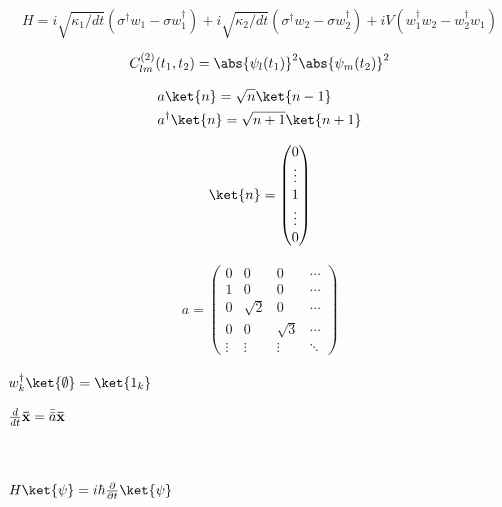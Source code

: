 \begin{equation}
    H = i \sqrt{\kappa_1/dt}(\sigma^\dagger w_1 - \sigma w_1^\dagger)+i \sqrt{\kappa_2/dt}(\sigma^\dagger w_2 - \sigma w_2^\dagger) + i V(w_1 ^\dagger w_2 - w_2^\dagger w_1) 
\end{equation}

\begin{equation}
    C_{lm}^{(2)}(t_1,t_2) = \abs{\psi_l(t_1)}^2 \abs{\psi_m(t_2)}^2
\end{equation}


\begin{align}
    & a \ket{n} = \sqrt{n} \ket{n-1} \\
    & a^\dagger \ket{n} = \sqrt{n+1} \ket{n+1}
\end{align}

\begin{align}
    \ket{n} = \begin{pmatrix} 0 \\ \vdots \\ 1  \\ \vdots \\ 0  \end{pmatrix}
\end{align}

\begin{align}
a = \begin{pmatrix}
0 & 0 & 0 & \cdots \\
1 & 0 & 0 & \cdots \\
0 & \sqrt{2} & 0 & \cdots \\
0 & 0 & \sqrt{3} & \cdots \\
\vdots & \vdots & \vdots & \ddots
\end{pmatrix}
\end{align}


$w_k^\dagger \ket{\emptyset} = \ket{1_k} \ \ \\ \ \\ $ 

$\frac{d}{dt} \mathbf{\Bar{x}} = \bar{\bar{a}} \mathbf{\Bar{x}}$ \ \ \\ \ \ \\ \ \

${H}\ket{\psi} = i\hbar\frac{\partial }{\partial t} \ket{\psi}$
